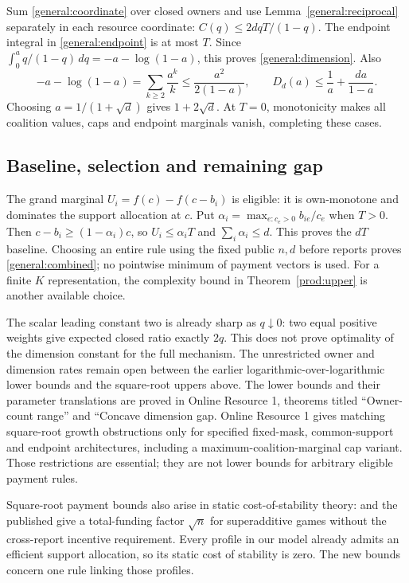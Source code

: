 \documentclass[11pt]{article}
\theoremstyle{definition}\newtheorem{definition}[theorem]{Definition}
\theoremstyle{remark}\newtheorem{remark}[theorem]{Remark}
\begin{document}
Sum \eqref{general:coordinate} over closed owners and use
Lemma~\ref{general:reciprocal} separately in each resource coordinate:
$C(q)\le 2dqT/(1-q)$. The endpoint integral in
\eqref{general:endpoint} is at most $T$. Since
$\int_0^a q/(1-q)\,dq=-a-\log(1-a)$, this proves
\eqref{general:dimension}. Also
\[
 -a-\log(1-a)=\sum_{k\ge2}\frac{a^k}{k}
 \le\frac{a^2}{2(1-a)},\qquad
 D_d(a)\le\frac1a+\frac{da}{1-a}.
\]
Choosing $a=1/(1+\sqrt d)$ gives $1+2\sqrt d$.
At $T=0$, monotonicity makes all coalition values, caps and endpoint
marginals vanish, completing these cases.

\subsection{Baseline, selection and remaining gap}
The grand marginal $U_i=f(c)-f(c-b_i)$ is eligible: it is own-monotone and
dominates the support allocation at $c$. Put
$\alpha_i=\max_{e:c_e>0}b_{ie}/c_e$ when $T>0$.
Then $c-b_i\ge(1-\alpha_i)c$, so $U_i\le\alpha_iT$ and
$\sum_i\alpha_i\le d$. This proves the $dT$ baseline.
Choosing an entire rule using the fixed public $n,d$ before reports proves
\eqref{general:combined}; no pointwise minimum of payment vectors is used.
For a finite $K$ representation, the complexity bound in
Theorem~\ref{prod:upper} is another available choice.

The scalar leading constant two is already sharp as $q\downarrow0$:
two equal positive weights give expected closed ratio exactly $2q$.
This does not prove optimality of the dimension constant for the full mechanism.
The unrestricted owner and dimension rates remain open between the earlier
logarithmic-over-logarithmic lower bounds and the square-root uppers above.
The lower bounds and their parameter translations are proved in Online
Resource 1, theorems titled ``Owner-count range'' and ``Concave dimension gap.
Online Resource 1 gives matching square-root growth obstructions only for
specified fixed-mask, common-support and endpoint architectures, including
a maximum-coalition-marginal cap variant. Those restrictions are essential;
they are not lower bounds for arbitrary eligible payment rules.

Square-root payment bounds also arise in static cost-of-stability theory:
\citet[Theorem 3.5]{Bachrach2009} and the published
\citet[Theorem 7]{Bachrach} give a total-funding factor $\sqrt n$ for
superadditive games without the cross-report incentive requirement. Every profile in our
model already admits an efficient support allocation, so its static cost of
stability is zero. The new bounds concern one rule linking those profiles.
\end{document}
